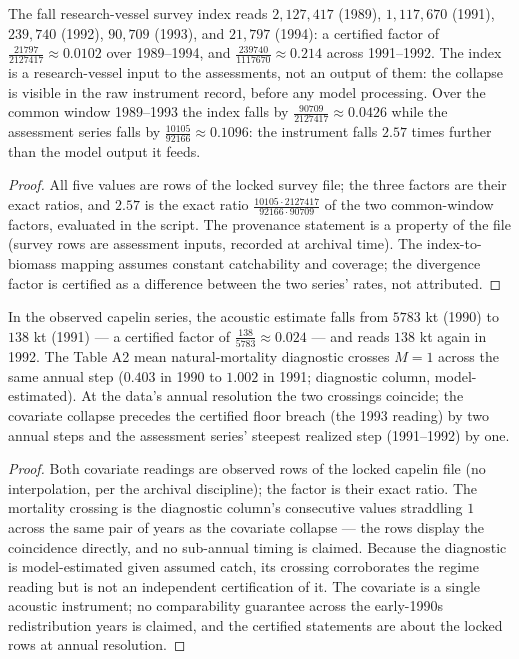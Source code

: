 \begin{proposition}
\label{regime-prop:survey}
The fall research-vessel survey index reads \(2{,}127{,}417\) (1989),
\(1{,}117{,}670\) (1991), \(239{,}740\) (1992), \(90{,}709\) (1993),
and \(21{,}797\) (1994): a certified factor of
\(\tfrac{21797}{2127417} \approx 0.0102\) over 1989--1994, and
\(\tfrac{239740}{1117670} \approx 0.214\) across 1991--1992. The index
is a research-vessel input to the assessments, not an output of them:
the collapse is visible in the raw instrument record, before any model
processing. Over the common window 1989--1993 the index falls by
\(\tfrac{90709}{2127417} \approx 0.0426\) while the assessment series
falls by \(\tfrac{10105}{92166} \approx 0.1096\): the instrument falls
\(2.57\) times further than the model output it feeds.
\end{proposition}

\begin{proof}
All five values are rows of the locked survey file; the three factors
are their exact ratios, and \(2.57\) is the exact ratio
\(\tfrac{10105 \cdot 2127417}{92166 \cdot 90709}\) of the two
common-window factors, evaluated in the script. The provenance
statement is a property of the file (survey rows are assessment
inputs, recorded at archival time). The index-to-biomass mapping
assumes constant catchability and coverage; the divergence factor is
certified as a difference between the two series' rates, not attributed.
\end{proof}

\begin{proposition}\label{regime-prop:capelin}
In the observed capelin series, the acoustic estimate falls from
\(5783\) kt (1990) to \(138\) kt (1991) --- a certified factor of
\(\tfrac{138}{5783} \approx 0.024\) --- and reads \(138\) kt again in
1992. The Table A2 mean natural-mortality diagnostic crosses
\(M = 1\) across the same annual step (\(0.403\) in 1990 to \(1.002\)
in 1991; diagnostic column, model-estimated). At the data's annual
resolution the two crossings coincide; the covariate collapse precedes
the certified floor breach (the 1993 reading) by two annual steps and
the assessment series' steepest realized step (1991--1992) by one.
\end{proposition}

\begin{proof}
Both covariate readings are observed rows of the locked capelin file
(no interpolation, per the archival discipline); the factor is their
exact ratio. The mortality crossing is the diagnostic column's
consecutive values straddling \(1\) across the same pair of years as
the covariate collapse --- the rows display the coincidence directly,
and no sub-annual timing is claimed. Because the diagnostic is
model-estimated given assumed catch, its crossing corroborates the
regime reading but is not an independent certification of it. The
covariate is a single acoustic instrument; no comparability guarantee
across the early-1990s redistribution years is claimed, and the
certified statements are about the locked rows at annual resolution.
\end{proof}

